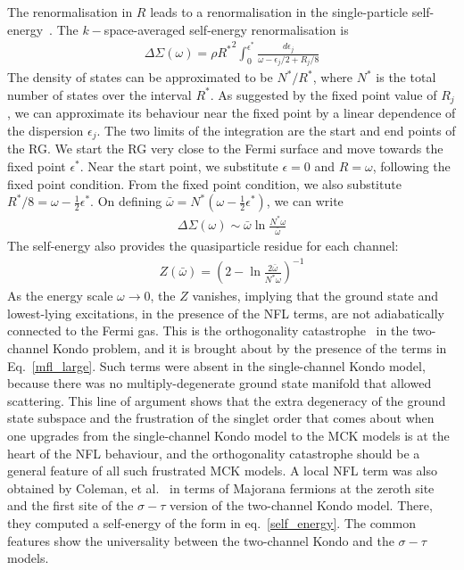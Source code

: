 \documentclass[reprint,prb,superscriptaddress]{revtex4-2}
\begin{document}
The renormalisation in \(R\) leads to a renormalisation in the single-particle self-energy~\cite{anirbanmott1}. The \(k-\)space-averaged self-energy renormalisation is
\begin{equation}\begin{aligned}
	\Delta \Sigma(\omega) = \rho {R^*}^2\int_0^{\epsilon^*} \frac{d\epsilon_j}{\omega - \epsilon_j/2 + R_j/8}
\end{aligned}\end{equation}
The density of states can be approximated to be \(N^*/R^*\), where \(N^*\) is the total number of states over the interval \(R^*\). As suggested by the fixed point value of \(R_j\), we can approximate its behaviour near the fixed point by a linear dependence of the dispersion \(\epsilon_j\). The two limits of the integration are the start and end points of the RG. We start the RG very close to the Fermi surface and move towards the fixed point \(\epsilon^*\). Near the start point, we substitute \(\epsilon = 0\) and \(R = \omega\), following the fixed point condition. From the fixed point condition, we also substitute \(R^*/8 = \omega - \frac{1}{2}\epsilon^*\). On defining \(\bar \omega = N^* \left(\omega - \frac{1}{2}\epsilon^*\right)\), we can write
\begin{equation}\begin{aligned}
	\label{self_energy}
	\Delta \Sigma(\omega) \sim  \bar \omega \ln \frac{N^* \omega}{\bar \omega}
\end{aligned}\end{equation}
The self-energy also provides the quasiparticle residue for each channel\cite{anirbanmott1}:
\begin{equation}\begin{aligned}
	Z(\bar\omega) = \left(2 - \ln \frac{2\bar\omega}{N^* \omega}\right) ^{-1}
\end{aligned}\end{equation}
{As the energy scale \(\omega \to 0\), the \(Z\) vanishes, implying that the ground state and lowest-lying excitations, in the presence of the NFL terms, are not adiabatically connected to the Fermi gas. This is the orthogonality catastrophe~\cite{varma2002singular,anderson_infraredcat,yamada_catastrophe,yamada1979orthogonality} in the two-channel Kondo problem, and it is brought about by the presence of the terms in Eq.~\ref{mfl_large}}. Such terms were absent in the single-channel Kondo model, because there was no multiply-degenerate ground state manifold that allowed scattering. This line of argument shows that the extra degeneracy of the ground state subspace and the frustration of the singlet order that comes about when one upgrades from the single-channel Kondo model to the MCK models is at the heart of the NFL behaviour, and the orthogonality catastrophe should be a general feature of all such frustrated MCK models. A local NFL term was also obtained by Coleman, et al.~\cite{Coleman_tsvelik} in terms of Majorana fermions at the zeroth site and the first site of the \(\sigma-\tau\) version of the two-channel Kondo model. There, they computed a self-energy of the form in eq.~\ref{self_energy}. The common features show the universality between the two-channel Kondo and the \(\sigma-\tau\) models. 
\end{document}
